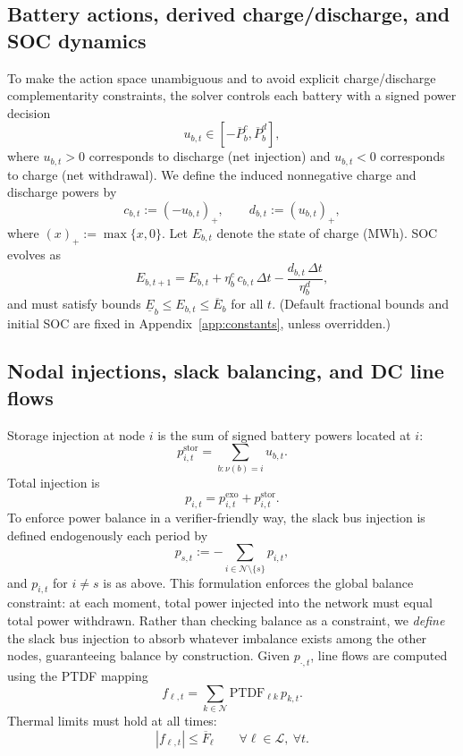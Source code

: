 \documentclass[11pt]{article}
\begin{document}
\subsection{Battery actions, derived charge/discharge, and SOC dynamics}
To make the action space unambiguous and to avoid explicit charge/discharge complementarity constraints, the solver controls each battery with a signed power decision
\[
u_{b,t}\in[-\overline{P}^c_b,\overline{P}^d_b],
\]
where $u_{b,t}>0$ corresponds to discharge (net injection) and $u_{b,t}<0$ corresponds to charge (net withdrawal). We define the induced nonnegative charge and discharge powers by
\[
c_{b,t}:=(-u_{b,t})_+,\qquad d_{b,t}:=(u_{b,t})_+,
\]
where $(x)_+:=\max\{x,0\}$. Let $E_{b,t}$ denote the state of charge (MWh). SOC evolves as
\begin{equation}\label{eq:soc}
E_{b,t+1}=E_{b,t}+\eta^c_b\,c_{b,t}\,\Delta t-\frac{d_{b,t}\,\Delta t}{\eta^d_b},
\end{equation}
and must satisfy bounds $\underline{E}_b\le E_{b,t}\le \overline{E}_b$ for all $t$. (Default fractional bounds and initial SOC are fixed in Appendix~\ref{app:constants}, unless overridden.)

\subsection{Nodal injections, slack balancing, and DC line flows}
Storage injection at node $i$ is the sum of signed battery powers located at $i$:
\[
p^{\mathrm{stor}}_{i,t}=\sum_{b:\nu(b)=i} u_{b,t}.
\]
Total injection is
\[
p_{i,t}=p^{\mathrm{exo}}_{i,t}+p^{\mathrm{stor}}_{i,t}.
\]
To enforce power balance in a verifier-friendly way, the slack bus injection is defined endogenously each period by
\[
p_{s,t}:=-\sum_{i\in\mathcal{N}\setminus\{s\}} p_{i,t},
\]
and $p_{i,t}$ for $i\ne s$ is as above. This formulation enforces the global balance constraint: at each moment, total power injected into the network must equal total power withdrawn. Rather than checking balance as a constraint, we \emph{define} the slack bus injection to absorb whatever imbalance exists among the other nodes, guaranteeing balance by construction. Given $p_{\cdot,t}$, line flows are computed using the PTDF mapping
\begin{equation}\label{eq:flows}
f_{\ell,t}=\sum_{k\in\mathcal{N}} \mathrm{PTDF}_{\ell k}\,p_{k,t}.
\end{equation}
Thermal limits must hold at all times:
\begin{equation}\label{eq:limits}
|f_{\ell,t}|\le \overline{F}_\ell\qquad \forall \ell\in\mathcal{L},\ \forall t.
\end{equation}
\end{document}
